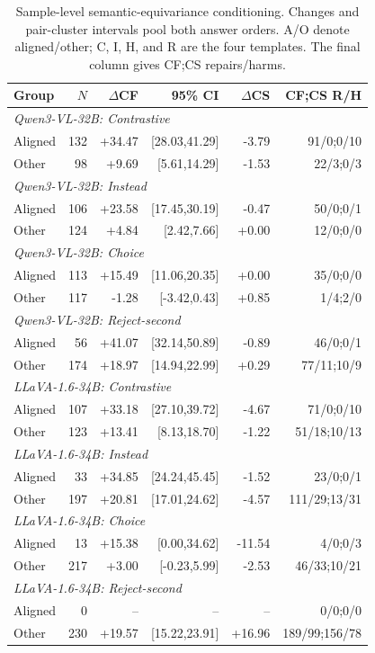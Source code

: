 \documentclass[letterpaper]{article}
\begin{document}
\begin{table}[t]
\centering
\small
\setlength{\tabcolsep}{1.2pt}
\begin{tabular}{lrrrrr}
\toprule
Group & $N$ & $\Delta$CF & 95\% CI & $\Delta$CS & CF;CS R/H \\
\midrule
\multicolumn{6}{l}{\itshape Qwen3-VL-32B: Contrastive} \\
Aligned & 132 & +34.47 & [28.03,41.29] & -3.79 & 91/0;0/10 \\
Other & 98 & +9.69 & [5.61,14.29] & -1.53 & 22/3;0/3 \\
\multicolumn{6}{l}{\itshape Qwen3-VL-32B: Instead} \\
Aligned & 106 & +23.58 & [17.45,30.19] & -0.47 & 50/0;0/1 \\
Other & 124 & +4.84 & [2.42,7.66] & +0.00 & 12/0;0/0 \\
\multicolumn{6}{l}{\itshape Qwen3-VL-32B: Choice} \\
Aligned & 113 & +15.49 & [11.06,20.35] & +0.00 & 35/0;0/0 \\
Other & 117 & -1.28 & [-3.42,0.43] & +0.85 & 1/4;2/0 \\
\multicolumn{6}{l}{\itshape Qwen3-VL-32B: Reject-second} \\
Aligned & 56 & +41.07 & [32.14,50.89] & -0.89 & 46/0;0/1 \\
Other & 174 & +18.97 & [14.94,22.99] & +0.29 & 77/11;10/9 \\
\midrule
\multicolumn{6}{l}{\itshape LLaVA-1.6-34B: Contrastive} \\
Aligned & 107 & +33.18 & [27.10,39.72] & -4.67 & 71/0;0/10 \\
Other & 123 & +13.41 & [8.13,18.70] & -1.22 & 51/18;10/13 \\
\multicolumn{6}{l}{\itshape LLaVA-1.6-34B: Instead} \\
Aligned & 33 & +34.85 & [24.24,45.45] & -1.52 & 23/0;0/1 \\
Other & 197 & +20.81 & [17.01,24.62] & -4.57 & 111/29;13/31 \\
\multicolumn{6}{l}{\itshape LLaVA-1.6-34B: Choice} \\
Aligned & 13 & +15.38 & [0.00,34.62] & -11.54 & 4/0;0/3 \\
Other & 217 & +3.00 & [-0.23,5.99] & -2.53 & 46/33;10/21 \\
\multicolumn{6}{l}{\itshape LLaVA-1.6-34B: Reject-second} \\
Aligned & 0 & -- & -- & -- & 0/0;0/0 \\
Other & 230 & +19.57 & [15.22,23.91] & +16.96 & 189/99;156/78 \\
\bottomrule
\end{tabular}
\caption{Sample-level semantic-equivariance conditioning. Changes and
pair-cluster intervals pool both answer orders. A/O denote aligned/other; C, I,
H, and R are the four templates. The final column gives CF;CS repairs/harms.}
\label{tab:semantic-conditioning-full}
\end{table}
\end{document}
